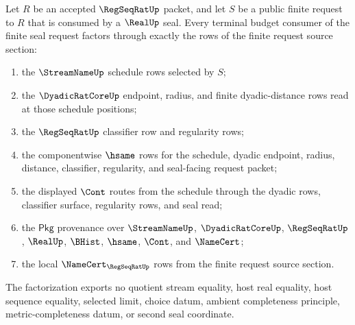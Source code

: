 \begin{theorem}
\label{thm:regseqrat-finite-request-terminal-budget-factorization}
Let $R$ be an accepted $\RegSeqRatUp$ packet, and let $S$ be a public finite
request to $R$ that is consumed by a $\RealUp$ seal. Every terminal budget
consumer of the finite seal request factors through exactly the rows of the
finite request source section:
\begin{enumerate}
\item the $\StreamNameUp$ schedule rows selected by $S$;
\item the $\DyadicRatCoreUp$ endpoint, radius, and finite dyadic-distance rows
read at those schedule positions;
\item the $\RegSeqRatUp$ classifier row and regularity rows;
\item the componentwise $\hsame$ rows for the schedule, dyadic endpoint,
radius, distance, classifier, regularity, and seal-facing request packet;
\item the displayed $\Cont$ routes from the schedule through the dyadic rows,
classifier surface, regularity rows, and seal read;
\item the $\mathsf{Pkg}$ provenance over $\StreamNameUp$, $\DyadicRatCoreUp$,
$\RegSeqRatUp$, $\RealUp$, $\BHist$, $\hsame$, $\Cont$, and $\NameCert$;
\item the local $\NameCert_{\RegSeqRatUp}$ rows from the finite request source
section.
\end{enumerate}
The factorization exports no quotient stream equality, host real equality,
host sequence equality, selected limit, choice datum, ambient completeness
principle, metric-completeness datum, or second seal coordinate.
\end{theorem}
